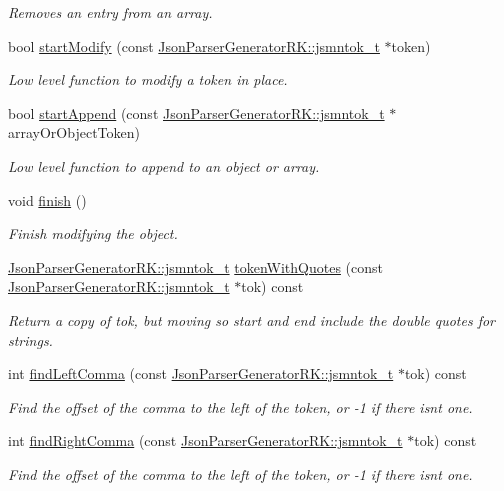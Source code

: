 \begin{DoxyCompactItemize}
\begin{DoxyCompactList}\small\item\em Removes an entry from an array. \end{DoxyCompactList}\item 
bool \hyperlink{class_json_modifier_aa53d66feb3cd13165f3a2eac012a123b}{start\+Modify} (const \hyperlink{struct_json_parser_generator_r_k_1_1jsmntok__t}{Json\+Parser\+Generator\+R\+K\+::jsmntok\+\_\+t} $\ast$token)
\begin{DoxyCompactList}\small\item\em Low level function to modify a token in place. \end{DoxyCompactList}\item 
bool \hyperlink{class_json_modifier_ab5bf356377a71120588413a4be998607}{start\+Append} (const \hyperlink{struct_json_parser_generator_r_k_1_1jsmntok__t}{Json\+Parser\+Generator\+R\+K\+::jsmntok\+\_\+t} $\ast$array\+Or\+Object\+Token)
\begin{DoxyCompactList}\small\item\em Low level function to append to an object or array. \end{DoxyCompactList}\item 
void \hyperlink{class_json_modifier_ae531232fa98f72eea8ea6ba07c065497}{finish} ()
\begin{DoxyCompactList}\small\item\em Finish modifying the object. \end{DoxyCompactList}\item 
\hyperlink{struct_json_parser_generator_r_k_1_1jsmntok__t}{Json\+Parser\+Generator\+R\+K\+::jsmntok\+\_\+t} \hyperlink{class_json_modifier_a5e685480ff2e978480cdc215b340e3a7}{token\+With\+Quotes} (const \hyperlink{struct_json_parser_generator_r_k_1_1jsmntok__t}{Json\+Parser\+Generator\+R\+K\+::jsmntok\+\_\+t} $\ast$tok) const
\begin{DoxyCompactList}\small\item\em Return a copy of tok, but moving so start and end include the double quotes for strings. \end{DoxyCompactList}\item 
int \hyperlink{class_json_modifier_a5b67ce1041b0e40e467639de1eeeca1e}{find\+Left\+Comma} (const \hyperlink{struct_json_parser_generator_r_k_1_1jsmntok__t}{Json\+Parser\+Generator\+R\+K\+::jsmntok\+\_\+t} $\ast$tok) const
\begin{DoxyCompactList}\small\item\em Find the offset of the comma to the left of the token, or -\/1 if there isn\textquotesingle{}t one. \end{DoxyCompactList}\item 
int \hyperlink{class_json_modifier_a24fac4c2257f932aff41792214de35ca}{find\+Right\+Comma} (const \hyperlink{struct_json_parser_generator_r_k_1_1jsmntok__t}{Json\+Parser\+Generator\+R\+K\+::jsmntok\+\_\+t} $\ast$tok) const
\begin{DoxyCompactList}\small\item\em Find the offset of the comma to the left of the token, or -\/1 if there isn\textquotesingle{}t one. \end{DoxyCompactList}\end{DoxyCompactItemize}
